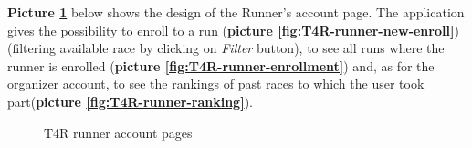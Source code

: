 \textbf{Picture \ref{fig:T4R-runner-account}} below shows the design of the Runner's account page.
The application gives the possibility to enroll to a run (\textbf{picture \ref{fig:T4R-runner-new-enroll}}) (filtering available race by clicking on \emph{Filter} button), to see all runs where the runner is enrolled (\textbf{picture \ref{fig:T4R-runner-enrollment}}) and, as for the organizer account, to see the rankings of past races to which the user took part(\textbf{picture \ref{fig:T4R-runner-ranking}}).

\begin{figure}[H]
  \centering
  \caption{T4R runner account pages}
  \label{fig:T4R-runner-account}
\end{figure}

